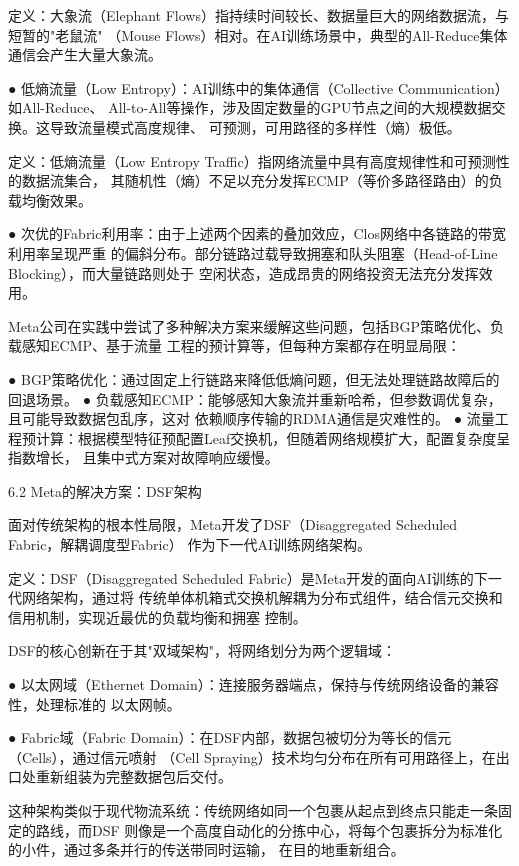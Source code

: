   定义：大象流（Elephant Flows）指持续时间较长、数据量巨大的网络数据流，与短暂的"老鼠流"
  （Mouse Flows）相对。在AI训练场景中，典型的All-Reduce集体通信会产生大量大象流。

● 低熵流量（Low Entropy）：AI训练中的集体通信（Collective Communication）如All-Reduce、
  All-to-All等操作，涉及固定数量的GPU节点之间的大规模数据交换。这导致流量模式高度规律、
  可预测，可用路径的多样性（熵）极低。
  
  定义：低熵流量（Low Entropy Traffic）指网络流量中具有高度规律性和可预测性的数据流集合，
  其随机性（熵）不足以充分发挥ECMP（等价多路径路由）的负载均衡效果。

● 次优的Fabric利用率：由于上述两个因素的叠加效应，Clos网络中各链路的带宽利用率呈现严重
  的偏斜分布。部分链路过载导致拥塞和队头阻塞（Head-of-Line Blocking），而大量链路则处于
  空闲状态，造成昂贵的网络投资无法充分发挥效用。

Meta公司在实践中尝试了多种解决方案来缓解这些问题，包括BGP策略优化、负载感知ECMP、基于流量
工程的预计算等，但每种方案都存在明显局限：

● BGP策略优化：通过固定上行链路来降低低熵问题，但无法处理链路故障后的回退场景。
● 负载感知ECMP：能够感知大象流并重新哈希，但参数调优复杂，且可能导致数据包乱序，这对
  依赖顺序传输的RDMA通信是灾难性的。
● 流量工程预计算：根据模型特征预配置Leaf交换机，但随着网络规模扩大，配置复杂度呈指数增长，
  且集中式方案对故障响应缓慢。

6.2  Meta的解决方案：DSF架构

面对传统架构的根本性局限，Meta开发了DSF（Disaggregated Scheduled Fabric，解耦调度型Fabric）
作为下一代AI训练网络架构。

定义：DSF（Disaggregated Scheduled Fabric）是Meta开发的面向AI训练的下一代网络架构，通过将
传统单体机箱式交换机解耦为分布式组件，结合信元交换和信用机制，实现近最优的负载均衡和拥塞
控制。

DSF的核心创新在于其"双域架构"，将网络划分为两个逻辑域：

● 以太网域（Ethernet Domain）：连接服务器端点，保持与传统网络设备的兼容性，处理标准的
  以太网帧。
  
● Fabric域（Fabric Domain）：在DSF内部，数据包被切分为等长的信元（Cells），通过信元喷射
  （Cell Spraying）技术均匀分布在所有可用路径上，在出口处重新组装为完整数据包后交付。

这种架构类似于现代物流系统：传统网络如同一个包裹从起点到终点只能走一条固定的路线，而DSF
则像是一个高度自动化的分拣中心，将每个包裹拆分为标准化的小件，通过多条并行的传送带同时运输，
在目的地重新组合。

